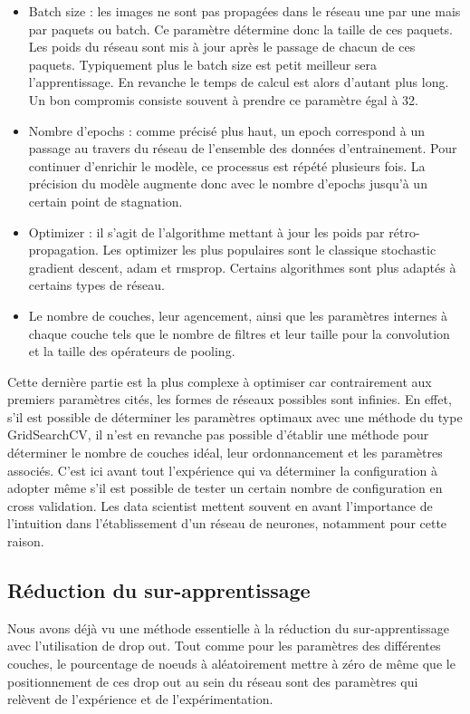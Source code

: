 \begin{itemize}
\item Batch size : les images ne sont pas propagées dans le réseau une par une mais par 
paquets ou batch. Ce paramètre détermine donc la taille de ces paquets. Les poids du réseau
sont mis à jour après le passage de chacun de ces paquets. Typiquement plus le batch size
est petit meilleur sera l'apprentissage. En revanche le temps de calcul est alors d'autant
plus long. Un bon compromis consiste souvent à prendre ce paramètre égal à 32.
\item Nombre d'epochs : comme précisé plus haut, un epoch correspond à un passage au travers du réseau de 
l'ensemble des données d'entrainement. Pour continuer d'enrichir le modèle, ce processus 
est répété plusieurs fois. La précision du modèle augmente donc avec le nombre d'epochs 
jusqu'à un certain point de stagnation. 
\item Optimizer : il s'agit de l'algorithme mettant à jour les poids par rétro-propagation.
Les optimizer les plus populaires sont le classique stochastic gradient descent, adam et
rmsprop. Certains algorithmes sont plus adaptés à certains types de réseau. 
\item Le nombre de couches, leur agencement, ainsi que les paramètres internes 
à chaque couche tels que le nombre de filtres et leur taille pour la convolution
et la taille des opérateurs de pooling. 
\end{itemize}

Cette dernière partie est la plus complexe à optimiser car contrairement aux premiers 
paramètres cités, les formes de réseaux possibles sont infinies. En effet, s'il est possible 
de déterminer les paramètres optimaux avec une méthode du type GridSearchCV, il n'est en 
revanche pas possible d'établir une méthode pour déterminer le nombre de couches idéal, 
leur ordonnancement et les paramètres associés. C'est ici avant tout l'expérience qui va 
déterminer la configuration à adopter même s'il est possible de tester un certain nombre de
configuration en cross validation. Les data scientist mettent souvent en avant l'importance
de l'intuition dans l'établissement d'un réseau de neurones, notamment pour cette raison.

\subsection{Réduction du sur-apprentissage}

Nous avons déjà vu une méthode essentielle à la réduction du sur-apprentissage avec 
l'utilisation de drop out. Tout comme pour les paramètres des différentes couches, le 
pourcentage de noeuds à aléatoirement mettre à zéro de même que le positionnement de ces
drop out au sein du réseau sont des paramètres qui relèvent de l'expérience et de 
l'expérimentation. 

